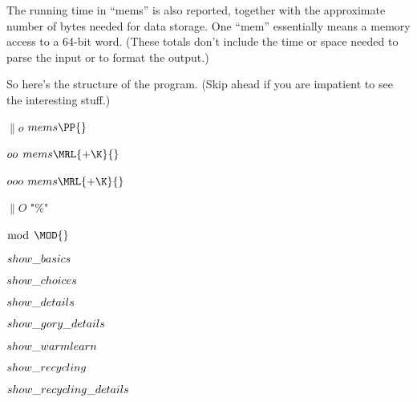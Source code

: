 The running time in ``mems'' is also reported, together with the approximate
number of bytes needed for data storage. One ``mem'' essentially means a
memory access to a 64-bit word.
(These totals don't include the time or space needed to parse the
input or to format the output.)

\fi

So here's the structure of the program. (Skip ahead if you are
impatient to see the interesting stuff.)

\Y\B\4\D$\|o$ \5
$\\{mems}\PP{}$\par
\B\4\D$\\{oo}$ \5
$\\{mems}\MRL{+{\K}}{}$\par
\B\4\D$\\{ooo}$ \5
$\\{mems}\MRL{+{\K}}{}$\par
\B\4\D$\|O$ \5
\.{"\%"}\par
\B\4\D$\bmod$ \5
$\MOD{}$\Y\par
\B\4\D$\\{show\_basics}$ \5
\par
\B\4\D$\\{show\_choices}$ \5
\par
\B\4\D$\\{show\_details}$ \5
\par
\B\4\D$\\{show\_gory\_details}$ \5
\par
\B\4\D$\\{show\_warmlearn}$ \5
%
\par
\B\4\D$\\{show\_recycling}$ \5
\par
\B\4\D$\\{show\_recycling\_details}$ \5
